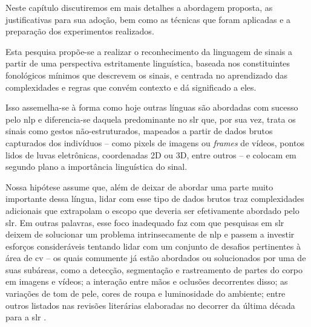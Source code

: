 Neste capítulo discutiremos em mais detalhes a abordagem proposta, as justificativas para sua adoção, bem como as técnicas que foram aplicadas e a preparação dos experimentos realizados.

Esta pesquisa propõe-se a realizar o reconhecimento da linguagem de sinais a partir de uma perspectiva estritamente linguística, baseada nos constituintes fonológicos mínimos que descrevem os sinais, e centrada no aprendizado das complexidades e regras que convém contexto e dá significado a eles.

Isso assemelha-se à forma como hoje outras línguas são abordadas com sucesso pelo \acrfull{nlp} e diferencia-se daquela predominante no \acrfull{slr} que, por sua vez, trata os sinais como gestos não-estruturados, mapeados a partir de dados brutos capturados dos indivíduos -- como pixels de imagens ou \textit{frames} de vídeos, pontos lidos de luvas eletrônicas, coordenadas 2D ou 3D, entre outros -- e colocam em segundo plano a importância linguística do sinal.


Nossa hipótese assume que, além de deixar de abordar uma parte muito importante dessa língua, lidar com esse tipo de dados brutos traz complexidades adicionais que extrapolam o escopo que deveria ser efetivamente abordado pelo \acrshort{slr}.
Em outras palavras, esse foco inadequado faz com que pesquisas em \acrshort{slr} deixem de solucionar um problema intrinsecamente de \acrshort{nlp} e passem a investir esforços consideráveis tentando lidar com um conjunto de desafios pertinentes à área de \acrfull{cv} -- os quais comumente já estão abordados ou solucionados por uma de suas subáreas, como a detecção, segmentação e rastreamento de partes do corpo em imagens e vídeos; a interação entre mãos e oclusões decorrentes disso; as variações de tom de pele, cores de roupa e luminosidade do ambiente; entre outros listados nas revisões literárias elaboradas no decorrer da última década para a \acrshort{slr} \cite{papastratis-2021-ai-technologies-sl,rastgoo-2021-slr-deep-survey,koller-2020-quantitative-survey-slr,bragg-2019-slr-interdisciplinary,wadhawan-2019-slr-literature-review,suharjito-2018-feature-extraction-survey,joksimoski-2022-scoping-review,cooper-2011-slr}.

